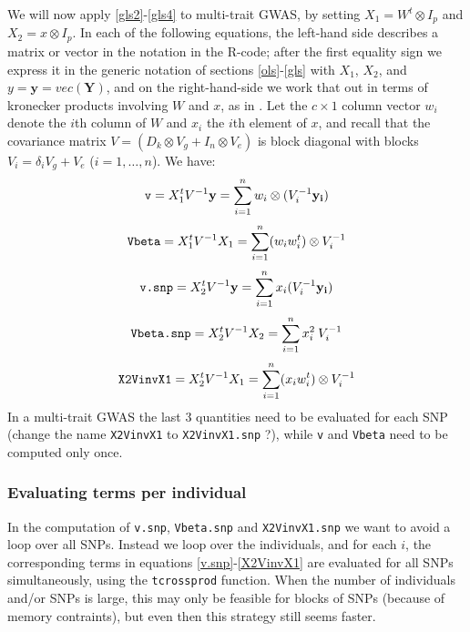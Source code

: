 \documentclass[12pt]{article}
\begin{document}
We will now apply \eqref{gls2}-\eqref{gls4} to multi-trait GWAS, by setting $X_1 = W^t \otimes I_p$ and $X_2 = x \otimes I_p$. In each of the following equations, the left-hand side describes a matrix or vector in the notation in the R-code; after the first equality sign we express it in the generic notation of sections \ref{ols}-\ref{gls} with $X_1$, $X_2$, and $y = \mathbf{y} = vec(\mathbf{Y})$, and on the right-hand-side we work that out in terms of kronecker products involving $W$ and $x$, as in \cite{zhou_stephens_2014}. Let the $c \times 1$ column vector $w_i$ denote the $i$th column of $W$ and $x_i$ the $i$th element of $x$, and 
recall that the covariance matrix $V = (D_k \otimes V_g  + I_n \otimes V_e)$ is block diagonal with blocks
$V_i = \delta_i V_g + V_e$ ($i = 1,\ldots,n$). We have:
%
\begin{equation} \label{v}
\verb|v| = X_1^t V^{-1} \mathbf{y} = 
\sum_{i=1}^n w_i  \otimes (V_i^{-1} \mathbf{y_i})
\end{equation}
%
\begin{equation} \label{Vbeta}
\verb|Vbeta| = X_1^t V^{-1} X_1 = \sum_{i=1}^n (w_i w_i^t)  \otimes V_i^{-1}
\end{equation}
%
\begin{equation} \label{v.snp}
\verb|v.snp| = X_2^t V^{-1} \mathbf{y} = \sum_{i=1}^n x_i (V_i^{-1} \mathbf{y_i})
\end{equation}
%
\begin{equation} \label{Vbeta.snp}
\verb|Vbeta.snp| = X_2^t V^{-1} X_2 = \sum_{i=1}^n x_i^2 \: V_i^{-1}
\end{equation}
%
\begin{equation} \label{X2VinvX1}
\verb|X2VinvX1| = X_2^t V^{-1} X_1 = \sum_{i=1}^n (x_i w_i^t)  \otimes V_i^{-1} 
\end{equation}
%
In a multi-trait GWAS the last 3 quantities need to be evaluated for each SNP (change the name \verb|X2VinvX1| to \verb|X2VinvX1.snp| ?), while \verb|v| and \verb|Vbeta| need to be computed only once.

\subsubsection{Evaluating terms per individual}

In the computation of \verb|v.snp|, \verb|Vbeta.snp| and \verb|X2VinvX1.snp| we want to avoid a loop over all SNPs. Instead we loop over the individuals, and for each $i$, the corresponding terms in equations \eqref{v.snp}-\eqref{X2VinvX1} are evaluated for all SNPs simultaneously, using the \verb|tcrossprod| function. When the number of individuals and/or SNPs is large, this may only be feasible for blocks of SNPs (because of memory contraints), but even then this strategy still seems faster.
\end{document}
